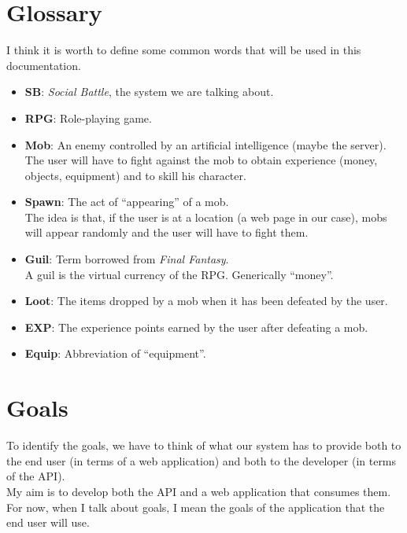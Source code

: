	\section{Glossary}
	I think it is worth to define some common words that will be used in this documentation.
	\begin{itemize}
		\item \textbf{SB}: \textit{Social Battle}, the system we are talking about.
		\item \textbf{RPG}: Role-playing game.
		\item \textbf{Mob}: An enemy controlled by an artificial intelligence (maybe the server).\\
			The user will have to fight against the mob to obtain experience (money, objects, equipment)
			and to skill his character.
		\item \textbf{Spawn}: The act of ``appearing'' of a mob.\\
			The idea is that, if the user is at a location (a web page in our case), mobs will appear 
			randomly and the user will have to fight them.
		\item \textbf{Guil}: Term borrowed from \textit{Final Fantasy}.\\
			A guil is the virtual currency of the RPG. Generically ``money''.
		\item \textbf{Loot}: The items dropped by a mob when it has been defeated by the user.
		\item \textbf{EXP}: The experience points earned by the user after defeating a mob.
		\item \textbf{Equip}: Abbreviation of ``equipment''.
	\end{itemize}

	\section{Goals}
	To identify the goals, we have to think of what our system has to provide both to the end user 
	(in terms of a web application) and both to the developer (in terms of the API).\\
	My aim is to develop both the API and a web application that consumes them.\\
	For now, when I talk about goals, I mean the goals of the application that the end user will use.

